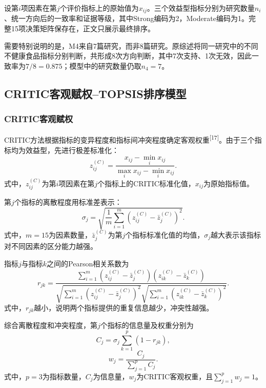 设第$i$项因素在第$j$个评价指标上的原始值为$x_{ij}$。三个效益型指标分别为研究数量$n_i$、统一方向后的一致率和证据等级，其中Strong编码为2，Moderate编码为1。完整15项决策矩阵保存在，正文只展示最终排序。

需要特别说明的是，M4来自7篇研究，而非8篇研究。原综述将同一研究中的不同不健康食品指标分别判断，共形成8次方向判断，其中7次支持、1次无效，因此一致率为$7/8=0.875$；模型中的研究数量仍取$n_4=7$。

\subsection{CRITIC客观赋权--TOPSIS排序模型}

\subsubsection{CRITIC客观赋权}

CRITIC方法根据指标的变异程度和指标间冲突程度确定客观权重\textsuperscript{[17]}。由于三个指标均为效益型，先进行极差标准化：
\begin{equation}
z_{ij}^{(C)}=
\frac{x_{ij}-\min_i x_{ij}}
{\max_i x_{ij}-\min_i x_{ij}} .
\end{equation}
式中，$z_{ij}^{(C)}$为第$i$项因素在第$j$个指标上的CRITIC标准化值，$x_{ij}$为原始指标值。

第$j$个指标的离散程度用标准差表示：
\begin{equation}
\sigma_j=
\sqrt{\frac{1}{m}\sum_{i=1}^{m}
\left(z_{ij}^{(C)}-\bar z_j^{(C)}\right)^2}.
\end{equation}
式中，$m=15$为因素数量，$\bar z_j^{(C)}$为第$j$个指标标准化值的均值，$\sigma_j$越大表示该指标对不同因素的区分能力越强。

指标$j$与指标$k$之间的Pearson相关系数为
\begin{equation}
r_{jk}=
\frac{\sum_{i=1}^{m}
\left(z_{ij}^{(C)}-\bar z_j^{(C)}\right)
\left(z_{ik}^{(C)}-\bar z_k^{(C)}\right)}
{\sqrt{\sum_{i=1}^{m}\left(z_{ij}^{(C)}-\bar z_j^{(C)}\right)^2}
\sqrt{\sum_{i=1}^{m}\left(z_{ik}^{(C)}-\bar z_k^{(C)}\right)^2}} .
\end{equation}
式中，$r_{jk}$越小，说明两个指标提供的重复信息越少，冲突性越强。

综合离散程度和冲突程度，第$j$个指标的信息量及权重分别为
\begin{equation}
C_j=\sigma_j\sum_{k=1}^{p}(1-r_{jk}),
\end{equation}
\begin{equation}
w_j=\frac{C_j}{\sum_{j=1}^{p}C_j}.
\end{equation}
式中，$p=3$为指标数量，$C_j$为信息量，$w_j$为CRITIC客观权重，且$\sum_{j=1}^{p}w_j=1$。

